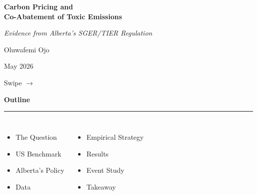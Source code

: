\documentclass[aspectratio=169,12pt]{beamer}
\title{}
\date{}
\author{}
\newcommand{\badge}[2][Navy]{%
  \colorbox{#1}{\color{white}\,\textbf{\small #2}\,}%
}
\newcommand{\slidetitle}[1]{%
  \vspace{0.6em}%
  {\color{Navy}\LARGE\textbf{#1}}%
  \vspace{0.3em}\par%
  \textcolor{Blue}{\rule{\linewidth}{1.2pt}}\par%
  \vspace{0.4em}%
}
\begin{document}

\begin{frame}[plain]

\vspace{1.8em}
{\color{white}\Large\textbf{Carbon Pricing and\\[4pt]
Co-Abatement of Toxic Emissions}}\par
\vspace{0.5em}
{\color{Navy}\normalsize\textit{Evidence from Alberta's SGER/TIER Regulation}}\par

\vspace{2.2em}
{\color{DarkText}\normalsize Oluwafemi Ojo}\par
{\color{MidGray}\small May 2026}\par

\vfill
\hfill\textcolor{MidGray}{\scriptsize Swipe \(\rightarrow\)}
\hspace{1.5em}
\end{frame}

\begin{frame}
\slidetitle{Outline}

\begin{columns}[T]
\begin{itemize}\setlength\itemsep{0.55em}
  \item[\badge{01}] The Question
  \item[\badge{02}] US Benchmark
  \item[\badge{03}] Alberta's Policy
  \item[\badge{04}] Data
\end{itemize}
\begin{itemize}\setlength\itemsep{0.55em}
  \item[\badge{05}] Empirical Strategy
  \item[\badge{06}] Results
  \item[\badge{07}] Event Study
  \item[\badge{08}] Takeaway
\end{itemize}
\end{columns}
\end{frame}
\end{document}
